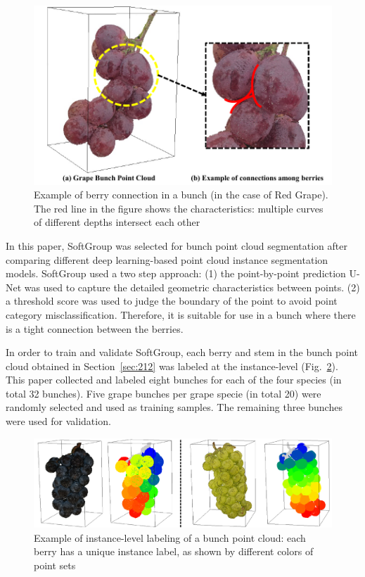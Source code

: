 \documentclass[12pt]{article}
\begin{document}
\begin{figure}[hbt!]
    \centering
    \includegraphics[width=1\textwidth]{figures/Figure5.pdf}
    \caption{Example of berry connection in a bunch (in the case of Red Grape). The red line in the figure shows the characteristics: multiple curves of different depths intersect each other}
    \label{fig:raw2}
\end{figure}

In this paper, SoftGroup \citep{vu_softgroup_2022} was selected for bunch point cloud segmentation after comparing different deep learning-based point cloud instance segmentation models. 
SoftGroup used a two step approach: 
(1) the point-by-point prediction U-Net was used to capture the detailed geometric characteristics between points. 
(2) a threshold score was used to judge the boundary of the point to avoid point category misclassification. 
Therefore, it is suitable for use in a bunch where there is a tight connection between the berries.

In order to train and validate SoftGroup, each berry and stem in the bunch point cloud obtained in Section~\ref{sec:212} was labeled at the instance-level (Fig.~\ref{fig:raw11}). 
This paper collected and labeled eight bunches for each of the four species (in total 32 bunches). 
Five grape bunches per grape specie (in total 20) were randomly selected and used as training samples. The remaining three bunches were used for validation.

\begin{figure}[hbt!]
    \centering
    \includegraphics[width=1\textwidth]{figures/Figure6.pdf}
    \caption{Example of instance-level labeling of a bunch point cloud: each berry has a unique instance label, as shown by different colors of point sets}
    \label{fig:raw11}
\end{figure}
\end{document}
